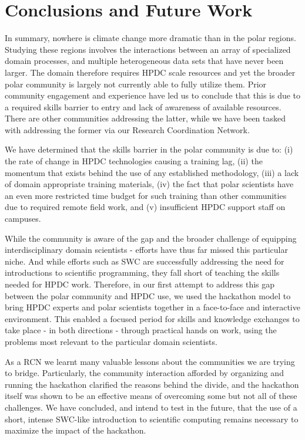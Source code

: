 \documentclass[conference]{IEEEtran}
\begin{document}
\section{Conclusions and Future Work}
In summary, nowhere is climate change more dramatic than in the polar regions. Studying these regions involves the interactions between an array of specialized domain processes, and multiple heterogeneous data sets that have never been larger. The domain therefore requires HPDC scale resources and yet the broader polar community is largely not currently able to fully utilize them. Prior community engagement and experience have led us to conclude that this is due to a required skills barrier to entry and lack of awareness of available resources. There are other communities addressing the latter, while we have been tasked with addressing the former via our Research Coordination Network.

We have determined that the skills barrier in the polar community is due to: (i) the rate of change in HPDC technologies causing a training lag, (ii) the momentum that exists behind the use of any established methodology, (iii) a lack of domain appropriate training materials, (iv) the fact that polar scientists have an even more restricted time budget for such training than other communities due to required remote field work, and (v) insufficient HPDC support staff on campuses.

While the community is aware of the gap and the broader challenge of equipping interdisciplinary domain scientists - efforts have thus far missed this particular niche.  And while efforts such as SWC are successfully addressing the need for introductions to scientific programming, they fall short of teaching the skills needed for HPDC work. Therefore, in our first attempt to address this gap between the polar community and HPDC use, we used the hackathon model to bring HPDC experts and polar scientists together in a face-to-face and interactive environment.  This enabled a focused period for skills and knowledge exchanges to take place - in both directions - through practical hands on work, using the problems most relevant to the particular domain scientists.  

As a RCN we learnt many valuable lessons about the communities we are trying to bridge. Particularly, the community interaction afforded by organizing and running the hackathon clarified the reasons behind the divide, and the hackathon itself was shown to be an effective means of overcoming some but not all of these challenges.  We have concluded, and intend to test in the future, that the use of a short, intense SWC-like introduction to scientific computing remains necessary to maximize the impact of the hackathon.  
\end{document}

